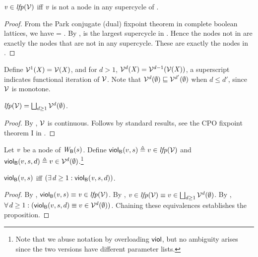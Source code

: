 \begin{proposition}  \label{prop:LFPisScViolations}
$\ndv \in  \lfp{\VFs}$ iff $\ndv$ is not a node in any supercycle of .    
\end{proposition}
%
\begin{proof}
From the Park conjugate (dual) fixpoint theorem in complete boolean lattices, we have 
\lfp{\VFs} = \compl{\gfp{\SFs}}.
By , \gfp{\SFs} is the largest supercycle in . Hence the nodes not in 
\gfp{\SFs} are exactly the nodes that are not in any supercycle. These are exactly the nodes in \lfp{\VFs}.
\end{proof}

Define $\VFi{\XS}{1} = \VF{\XS}$, and for $d > 1$, 
$\VFi{\XS}{d} = \VFi{\VF{\XS}}{d-1}$, \ie a superscript indicates functional iteration
of $\VFs$. Note that 
$\VFi{\ewfg}{d} \subg \VFi{\ewfg}{d'}$ when $d \le d'$, since $\VFs$ is monotone.

\begin{proposition}  \label{prop:computeLFP}
$\lfp{\VFs} = \JOIN_{d \ge 1} \VFi{\ewfg}{d}$.
\end{proposition}
%
\begin{proof}
By , $\VFs$ is continuous. Follows by standard results, \eg see the CPO fixpoint theorem I in 
.
\end{proof}



\begin{definition}
\label{def:supercycle-violation}
\label{def:supercycle.violation}
\label{defn:supercycle.violation}
Let $\ndv$ be a node of $\wfg{\B}{s}$. Define
$\scV{v}{s} \df v \in \lfp{\VFs}$ and 
$\scVd{v}{d}{s} \df v \in \VFs^{d} (\ewfg)$.\footnote{Note that
we abuse notation by overloading $\SMATHID{viol}$, but no ambiguity arises since the two versions have
different parameter lists.}

\end{definition}

\begin{proposition}
\label{prop:globViol-equiv-globViolDist}
$\scV{\ndv}{s}$ iff  $(\ex d \ge 1: \scVd{\ndv}{d}{s})$.
\end{proposition}
%
\begin{proof}
By , $\scV{\ndv}{s} \ev \ndv \in \lfp{\VFs}$.
By , $\ndv \in \lfp{\VFs} \ev v \in \JOIN_{d \ge 1} \VFi{\ewfg}{d}$.
By , $\fa d \ge 1: (\scVd{v}{d}{s} \ev v \in \VFs^{d} (\ewfg))$.
Chaining these equivalences establishes the proposition.
\end{proof}

